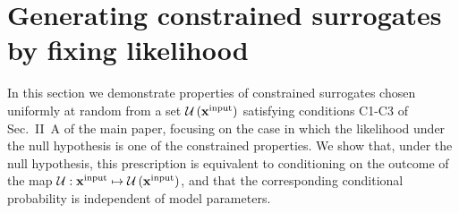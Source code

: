 \documentclass[%
prx,
reprint,
superscriptaddress,
nofootinbib,
 amsmath,amssymb,
 aps,
]{revtex4-2}
\newcommand{\xin}{{{\bf x}^{\text{input}}}}
\begin{document}

\section{Generating constrained surrogates by fixing likelihood}

In this section we demonstrate properties of constrained surrogates chosen uniformly at random from a set $\mathcal{U} \left( \xin \right)$ satisfying conditions C1-C3 of Sec.~II~A of the main paper, focusing on the case in which the likelihood under the null hypothesis is one of the constrained properties. We show that, under the null hypothesis, this prescription is equivalent to conditioning on the outcome of the map $\mathcal{U} : \xin \mapsto \mathcal{U} \left( \xin \right)$, and that the corresponding conditional probability is independent of model parameters. 


\end{document}

